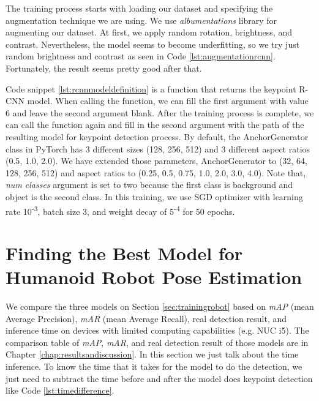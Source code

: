 The training process starts with loading our dataset and specifying the augmentation technique we are using. We use \emph{albumentations} library for augmenting our dataset.
At first, we apply random rotation, brightness, and contrast. Nevertheless, the model seems to become underfitting, so we try just random brightness and contrast as seen in Code \ref{lst:augmentationrcnn}. 
Fortunately, the result seems pretty good after that.



Code snippet \ref{lst:rcnnmodeldefinition} is a function that returns the keypoint R-CNN model.
When calling the function, we can fill the first argument with value 6
and leave the second argument blank. After the training process is complete, we can call the function again and fill in the second argument with the path of the resulting model for keypoint detection process.
By default, the AnchorGenerator class in PyTorch has 3 different sizes (128, 256, 512) and 3 different aspect ratios (0.5, 1.0, 2.0).
We have extended those parameters, AnchorGenerator to (32, 64, 128, 256, 512) and aspect ratios to (0.25, 0.5, 0.75, 1.0, 2.0, 3.0, 4.0).
Note that, \emph{num classes} argument is set to two because the first class is background and object is the second class.
In this training, we use SGD optimizer with learning rate 10\textsuperscript{-3}, batch size 3, and weight decay of 5\textsuperscript{-4} for 50 epochs.




\section{Finding the Best Model for Humanoid Robot Pose Estimation}
\label{sec:findingbestmodelhumanoidrobot}

We compare the three models on Section \ref{sec:trainingrobot} based on \emph{mAP} (mean Average Precision), \emph{mAR} (mean Average Recall),
real detection result, and inference time on devices with limited computing capabilities (e.g. NUC i5).
The comparison table of \emph{mAP}, \emph{mAR}, and real detection result of those models are in Chapter \ref{chap:resultsandiscussion}. In this section we just talk about the time inference.
To know the time that it takes for the model to do the detection, we just need to subtract the time before and after the model does keypoint detection like Code \ref{lst:timedifference}.

